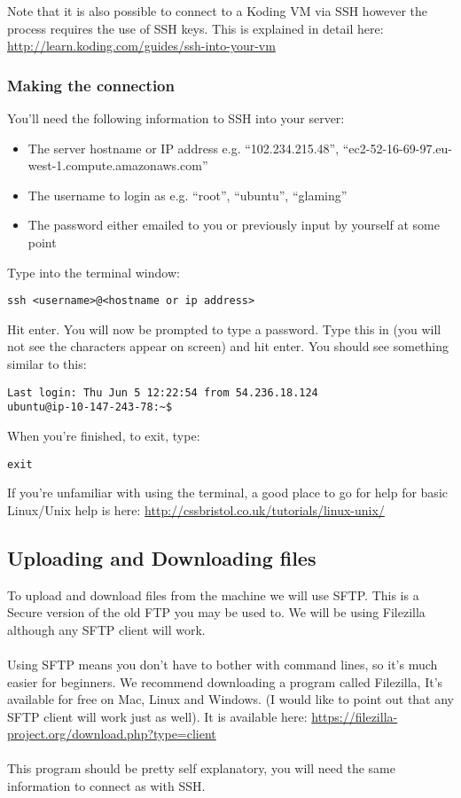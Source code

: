 \documentclass[twocolumn]{article}
\begin{document}
Note that it is also possible to connect to a Koding VM via SSH however the process requires the use of SSH keys. This is explained in detail here: \url{http://learn.koding.com/guides/ssh-into-your-vm}

\subsubsection{Making the connection}
\label{sec:MakingTheConnection}

You'll need the following information to SSH into your server:
\begin{itemize}
\item The server hostname or IP address e.g. ``102.234.215.48'', ``ec2-52-16-69-97.eu-west-1.compute.amazonaws.com'' 
\item The username to login as e.g. ``root'', ``ubuntu'', ``glaming''
\item The password either emailed to you or previously input by yourself at some point
\end{itemize}

Type into the terminal window:

\begin{lstlisting}
ssh <username>@<hostname or ip address>
\end{lstlisting}
Hit enter. You will now be prompted to type a password. Type this in (you will not see the characters appear on screen) and hit enter. You should see something similar to this:

\begin{lstlisting}
Last login: Thu Jun 5 12:22:54 from 54.236.18.124
ubuntu@ip-10-147-243-78:~$
\end{lstlisting}
When you're finished, to exit, type:
\begin{lstlisting}
exit
\end{lstlisting}

If you're unfamiliar with using the terminal, a good place to go for help for basic Linux/Unix help is here: \url{http://cssbristol.co.uk/tutorials/linux-unix/}

\subsection{Uploading and Downloading files}

To upload and download files from the machine we will use SFTP. This is a Secure version of the old FTP you may be used to. We will be using Filezilla although any SFTP client will work.\\
\\
Using SFTP means you don't have to bother with command lines, so it's much easier for beginners. We recommend downloading a program called Filezilla, It's available for free on Mac, Linux and Windows. (I would like to point out that any SFTP client will work just as well). It is available here: \url{https://filezilla-project.org/download.php?type=client}\\
\\
This program should be pretty self explanatory, you will need the same information to connect as with SSH.
\end{document}
